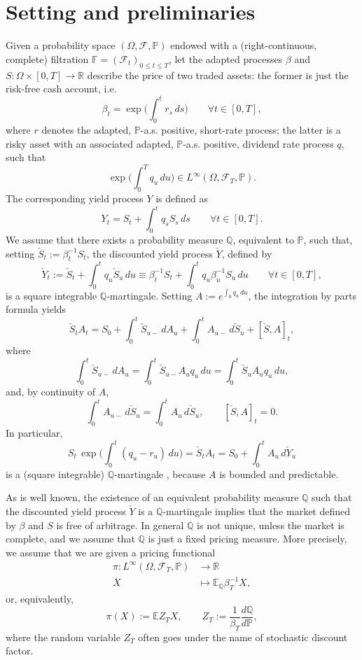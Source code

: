 \documentclass[11pt]{article}
\theoremstyle{remark}
\newcommand{\E}{\mathbb{E}}
\newcommand{\cF}{\mathcal{F}}
\renewcommand{\P}{\mathbb{P}}
\newcommand{\Q}{\mathbb{Q}}
\newcommand{\erre}{\mathbb{R}}
\begin{document}
\section{Setting and preliminaries}
\label{sec:prelim}
Given a probability space $(\Omega,\cF,\P)$ endowed with a
(right-continuous, complete) filtration $\mathbb{F}=(\cF_t)_{0\leq t\leq T}$,
let the adapted processes $\beta$ and
$S:\Omega \times [0,T] \to \erre$ describe the price of two traded
assets: the former is just the risk-free cash account, i.e.
\[
\beta_t = \exp\biggl( \int_0^t r_s\,ds \biggr) \qquad \forall t \in [0,T],
\]
where $r$ denotes the adapted, $\P$-a.s. positive, short-rate process;
the latter is a risky asset with an associated adapted,
$\P$-a.s. positive, dividend rate process $q$, such that
\[
\exp \biggl( \int_0^T q_u\,du \biggr) \in L^\infty(\Omega,\cF_T,\P).
\]
The corresponding yield process $Y$ is defined as
\[
Y_t = S_t + \int_0^t q_sS_s\,ds \qquad \forall t \in [0,T].
\]
We assume that there exists a probability measure $\Q$, equivalent to
$\P$, such that, setting $\check{S}_t := \beta_t^{-1}S_t$, the
discounted yield process $\check{Y}$, defined by
\[
\check{Y}_t := \check{S}_t + \int_0^t q_u \check{S}_u\,du \equiv
\beta_t^{-1}S_t + \int_0^t q_u\beta_u^{-1}S_u\,du
\qquad \forall t \in [0,T],
\]
is a square integrable $\Q$-martingale. Setting
$A:=e^{\int_0^\cdot q_u\,du}$, the integration by parts formula yields
\[
\check{S}_tA_t = S_0 + \int_0^t \check{S}_{u-}\,dA_u 
+ \int_0^t A_{u-}\,d\check{S}_u + [\check{S},A]_t,
\]
where
\[
\int_0^t \check{S}_{u-}\,dA_u = \int_0^t \check{S}_{u-} A_u q_u\,du
= \int_0^t \check{S}_u A_u q_u\,du,
\]
and, by continuity of $A$,
\[
\int_0^t A_{u-}\,d\check{S}_u = \int_0^t A_u\,d\check{S}_u, 
\qquad [\check{S},A]_t=0.
\]
In particular,
\[
S_t \, \exp\biggl(\int_0^t (q_u-r_u)\,du \biggr) = 
\check{S}_tA_t = S_0 + \int_0^t A_u\,d\check{Y}_u
\]
is a (square integrable) $\Q$-martingale , because $A$ is bounded and
predictable.

As is well known, the existence of an equivalent probability measure
$\Q$ such that the discounted yield process $\check{Y}$ is a
$\Q$-martingale implies that the market defined by $\beta$ and $S$ is
free of arbitrage. In general $\Q$ is not unique, unless the market is
complete, and we assume that $\Q$ is just a fixed pricing
measure. More precisely, we assume that we are given a pricing
functional
\begin{align*}
\pi: L^\infty(\Omega,\cF_T,\P) &\to \erre\\
X &\mapsto \E_{\Q} \beta_T^{-1}X,
\end{align*}
or, equivalently,
\[
\pi(X) := \E Z_TX, \qquad Z_T := \frac{1}{\beta_T} \frac{d\Q}{d\P},
\]
where the random variable $Z_T$ often goes under the name of
stochastic discount factor.
\end{document}
